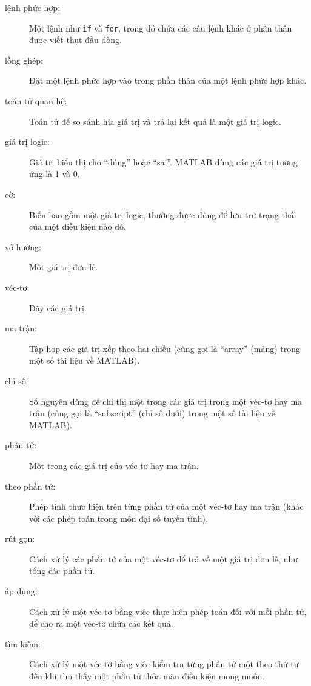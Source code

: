 \documentclass[12pt]{book}
\begin{document}
\begin{description}

\item[lệnh phức hợp:] Một lệnh như {\tt if} và {\tt for}, trong đó
chứa các câu lệnh khác ở phần thân được viết thụt đầu dòng.

\item[lồng ghép:] Đặt một lệnh phức hợp vào trong phần thân của một
lệnh phức hợp khác.

\item[toán tử quan hệ:] Toán tử để so sánh hia giá trị và trả lại
kết quả là một giá trị logic.

\item[giá trị logic:] Giá trị biểu thị cho ``đúng'' hoặc
``sai''.  MATLAB dùng các giá trị tương ứng là 1 và 0.

\item[cờ:] Biến bao gồm một giá trị logic, thường được dùng để lưu trữ
trạng thái của một điều kiện nào đó.

\item[vô hướng:] Một giá trị đơn lẻ.

\item[véc-tơ:] Dãy các giá trị.

\item[ma trận:] Tập hợp các giá trị xếp theo hai chiều (cũng gọi là
``array'' (mảng) trong một số tài liệu về MATLAB).

\item[chỉ số:] Số nguyên dùng để chỉ thị một trong các giá trị trong
một véc-tơ hay ma trận (cũng gọi là ``subscript'' (chỉ số dưới) trong
một số tài liệu về MATLAB).

\item[phần tử:] Một trong các giá trị của véc-tơ hay ma trận.

\item[theo phần tử:] Phép tính thực hiện trên từng phần tử của một
véc-tơ hay ma trận (khác với các phép toán trong môn đại số tuyến tính).

\item[rút gọn:] Cách xử lý các phần tử của một véc-tơ để trả về một
giá trị đơn lẻ, như tổng các phần tử.

\item[áp dụng:] Cách xử lý một véc-tơ bằng việc thực hiện phép
toán đối với mỗi phần tử, để cho ra một véc-tơ chứa các kết quả.

\item[tìm kiếm:] Cách xử lý một véc-tơ bằng việc kiểm tra từng phần tử
một theo thứ tự đến khi tìm thấy một phần tử thỏa mãn điều kiện mong muốn.

\end{description}
\end{document}
